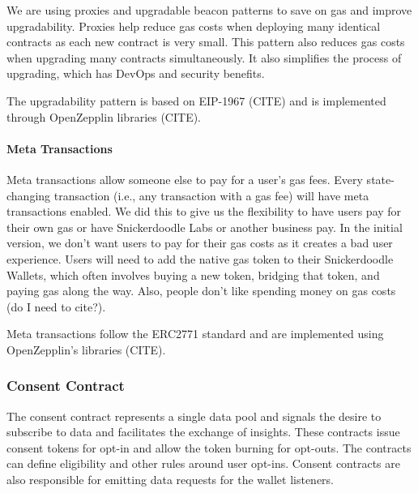 We are using proxies and upgradable beacon patterns to save on gas and improve upgradability. Proxies help reduce gas costs when deploying many identical contracts as each new contract is very small. This pattern also reduces gas costs when upgrading many contracts simultaneously. It also simplifies the process of upgrading, which has DevOps and security benefits.


The upgradability pattern is based on EIP-1967 (CITE) and is implemented through OpenZepplin libraries (CITE).

\paragraph{Meta Transactions}




Meta transactions allow someone else to pay for a user's gas fees. Every state-changing transaction (i.e., any transaction with a gas fee) will have meta transactions enabled. We did this to give us the flexibility to have users pay for their own gas or have Snickerdoodle Labs or another business pay. In the initial version, we don't want users to pay for their gas costs as it creates a bad user experience. Users will need to add the native gas token to their Snickerdoodle Wallets, which often involves buying a new token, bridging that token, and paying gas along the way. Also, people don't like spending money on gas costs (do I need to cite?). 

Meta transactions follow the ERC2771 standard and are implemented using OpenZepplin's libraries (CITE).


\subsubsection{Consent Contract}
\label{section:ConsentContract}
The consent contract represents a single data pool and signals the desire to subscribe to data and facilitates the exchange of insights. These contracts issue consent tokens for opt-in and allow the token burning for opt-outs. The contracts can define eligibility and other rules around user opt-ins. Consent contracts are also responsible for emitting data requests for the wallet listeners.

